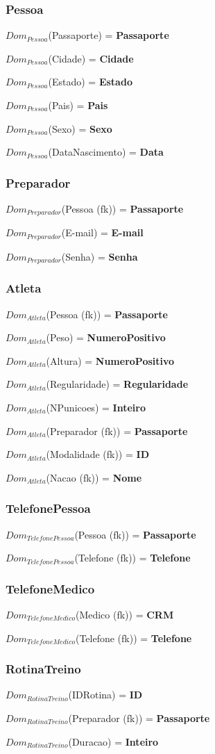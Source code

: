 \documentclass[12pt,a4paper]{article}
\newcommand{\createdomain}[3]{
    $Dom_{#1}$(#2) = {\bf #3}

}
\begin{document}
    \singlespacing
\subsubsection{Pessoa}
        \createdomain{Pessoa}{Passaporte}{\bf Passaporte}
        \createdomain{Pessoa}{Cidade}{\bf Cidade}
        \createdomain{Pessoa}{Estado}{\bf Estado}
        \createdomain{Pessoa}{Pais}{\bf Pais}
        \createdomain{Pessoa}{Sexo}{\bf Sexo}
        \createdomain{Pessoa}{DataNascimento}{\bf Data}

    \subsubsection{Preparador}
        \createdomain{Preparador}{Pessoa (fk)}{\bf Passaporte}
        \createdomain{Preparador}{E-mail}{\bf E-mail}
        \createdomain{Preparador}{Senha}{\bf Senha}

    \subsubsection{Atleta}
        \createdomain{Atleta}{Pessoa (fk)}{\bf Passaporte}
        \createdomain{Atleta}{Peso}{\bf NumeroPositivo}
        \createdomain{Atleta}{Altura}{\bf NumeroPositivo}
        \createdomain{Atleta}{Regularidade}{\bf Regularidade}
        \createdomain{Atleta}{NPunicoes}{\bf Inteiro}
        \createdomain{Atleta}{Preparador (fk)}{\bf Passaporte}
        \createdomain{Atleta}{Modalidade (fk)}{\bf ID}
        \createdomain{Atleta}{Nacao (fk)}{\bf Nome}

    \subsubsection{TelefonePessoa}
        \createdomain{TelefonePessoa}{Pessoa (fk)}{\bf Passaporte}
        \createdomain{TelefonePessoa}{Telefone (fk)}{\bf Telefone}

    \subsubsection{TelefoneMedico}
        \createdomain{TelefoneMedico}{Medico (fk)}{\bf CRM}
        \createdomain{TelefoneMedico}{Telefone (fk)}{\bf Telefone}

    \subsubsection{RotinaTreino}
        \createdomain{RotinaTreino}{IDRotina}{\bf ID}
        \createdomain{RotinaTreino}{Preparador (fk)}{\bf Passaporte}
        \createdomain{RotinaTreino}{Duracao}{\bf Inteiro}
\end{document}

